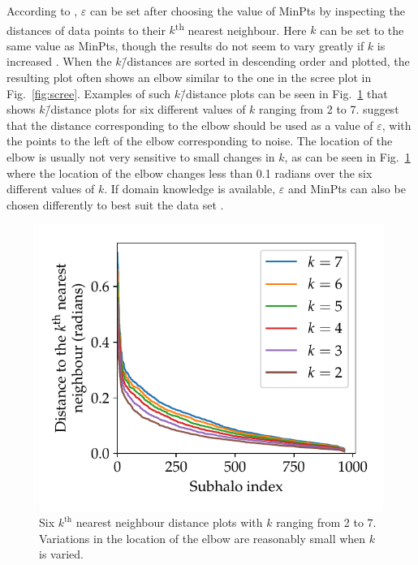 \documentclass[english, twoside]{HYgradu}
\begin{document}
According to \citet{ester1996density}, $\varepsilon$ can be set after choosing the value of MinPts by inspecting the distances of data points to their $k$\textsuperscript{th} nearest neighbour. Here $k$ can be set to the same value as MinPts, though the results do not seem to vary greatly if $k$ is increased \citep{ester1996density}. When the $k$\=/distances are sorted in descending order and plotted, the resulting plot often shows an elbow similar to the one in the scree plot in Fig.\ \ref{fig:scree}. Examples of such $k$\=/distance plots can be seen in Fig.\ \ref{fig:k-distances-singlesim} that shows $k$\=/distance plots for six different values of $k$ ranging from 2 to 7. \citet{ester1996density} suggest that the distance corresponding to the elbow should be used as a value of $\varepsilon$, with the points to the left of the elbow corresponding to noise. The location of the elbow is usually not very sensitive to small changes in $k$, as can be seen in Fig.\ \ref{fig:k-distances-singlesim} where the location of the elbow changes less than 0.1 radians over the six different values of $k$. If domain knowledge is available, $\varepsilon$ and MinPts can also be chosen differently to best suit the data set \citep{schubert2017dbscan}.

\begin{figure}
    \centering
    \includegraphics{kuvat/k-distances-singlesim.pdf}
    \caption{Six $k^{\text{th}}$ nearest neighbour distance plots with $k$ ranging from 2 to 7. Variations in the location of the elbow are reasonably small when $k$ is varied.}\label{fig:k-distances-singlesim}
\end{figure}
\end{document}

